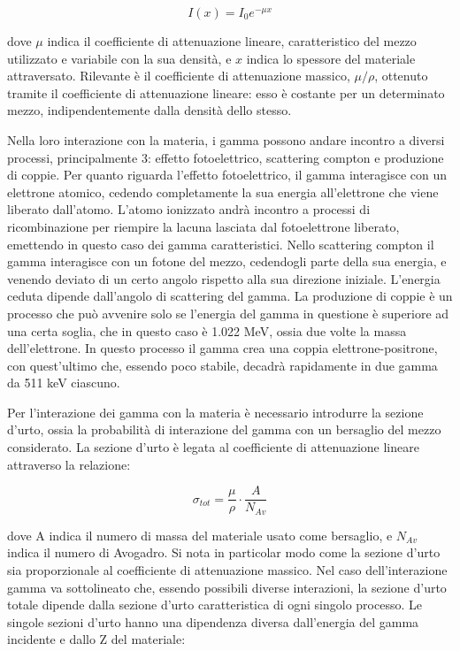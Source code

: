 \documentclass[a4paper,10pt]{article}
\begin{document}
\begin{equation}
	I(x)=I_{0}e^{-\mu x}
\end{equation}

\noindent dove $\mu$ indica il coefficiente di attenuazione lineare, caratteristico del mezzo utilizzato e variabile con la sua densit\`a, e $x$ indica lo spessore del materiale attraversato. Rilevante \`e il coefficiente di attenuazione massico, $\mu/\rho$, ottenuto tramite il coefficiente di attenuazione lineare: esso \`e costante per un determinato mezzo, indipendentemente dalla densit\`a dello stesso. 

\noindent Nella loro interazione con la materia, i gamma possono andare incontro a diversi processi, principalmente 3: effetto fotoelettrico, scattering compton e produzione di coppie. Per quanto riguarda l'effetto fotoelettrico, il gamma interagisce con un elettrone atomico, cedendo completamente la sua energia all'elettrone che viene liberato dall'atomo. L'atomo ionizzato andr\`a incontro a processi di ricombinazione per riempire la lacuna lasciata dal fotoelettrone liberato, emettendo in questo caso dei gamma caratteristici. Nello scattering compton il gamma interagisce con un fotone del mezzo, cedendogli parte della sua energia, e venendo deviato di un certo angolo rispetto alla sua direzione iniziale. L'energia ceduta dipende dall'angolo di scattering del gamma. La produzione di coppie \`e un processo che pu\`o avvenire solo se l'energia del gamma in questione \`e superiore ad una certa soglia, che in questo caso \`e 1.022 MeV, ossia due volte la massa dell'elettrone. In questo processo il gamma crea una coppia elettrone-positrone, con quest'ultimo che, essendo poco stabile, decadr\`a rapidamente in due gamma da 511 keV ciascuno. 

\noindent Per l'interazione dei gamma con la materia \`e necessario introdurre la sezione d'urto, ossia la probabilit\`a di interazione del gamma con un bersaglio del mezzo considerato. La sezione d'urto \`e legata al coefficiente di attenuazione lineare attraverso la relazione:

\begin{equation}
	\sigma_{tot}=\frac{\mu}{\rho} \cdot \frac{A}{N_{Av}}
\end{equation}

\noindent dove A indica il numero di massa del materiale usato come bersaglio, e $N_{Av}$ indica il numero di Avogadro. Si nota in particolar modo come la sezione d'urto sia proporzionale al coefficiente di attenuazione massico. Nel caso dell'interazione gamma va sottolineato che, essendo possibili diverse interazioni, la sezione d'urto totale dipende dalla sezione d'urto caratteristica di ogni singolo processo. Le singole sezioni d'urto hanno una dipendenza diversa dall'energia del gamma incidente e dallo Z del materiale:
\end{document}
